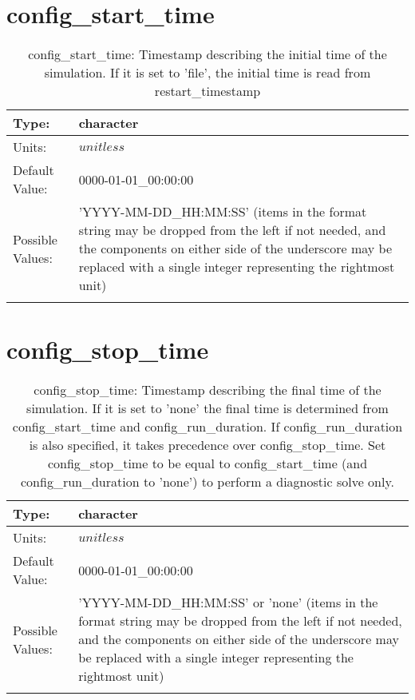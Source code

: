 \section[config\_start\_time]{config\_start\_time}
\label{sec:nm_sec_config_start_time}
\begin{center}
\begin{longtable}{| p{2.0in} || p{4.0in} |}
    \hline
    Type: & character \\
    \hline
    Units: & $unitless$ \\
    \hline
    Default Value: & 0000-01-01\_00:00:00 \\
    \hline
    Possible Values: & 'YYYY-MM-DD\_HH:MM:SS' (items in the format string may be dropped from the left if not needed, and the components on either side of the underscore may be replaced with a single integer representing the rightmost unit) \\
    \hline
    \caption{config\_start\_time: Timestamp describing the initial time of the simulation.  If it is set to 'file', the initial time is read from restart\_timestamp}
\end{longtable}
\end{center}
\section[config\_stop\_time]{config\_stop\_time}
\label{sec:nm_sec_config_stop_time}
\begin{center}
\begin{longtable}{| p{2.0in} || p{4.0in} |}
    \hline
    Type: & character \\
    \hline
    Units: & $unitless$ \\
    \hline
    Default Value: & 0000-01-01\_00:00:00 \\
    \hline
    Possible Values: & 'YYYY-MM-DD\_HH:MM:SS' or 'none' (items in the format string may be dropped from the left if not needed, and the components on either side of the underscore may be replaced with a single integer representing the rightmost unit) \\
    \hline
    \caption{config\_stop\_time: Timestamp describing the final time of the simulation. If it is set to 'none' the final time is determined from config\_start\_time and config\_run\_duration.  If config\_run\_duration is also specified, it takes precedence over config\_stop\_time.  Set config\_stop\_time to be equal to config\_start\_time (and config\_run\_duration to 'none') to perform a diagnostic solve only.}
\end{longtable}
\end{center}
